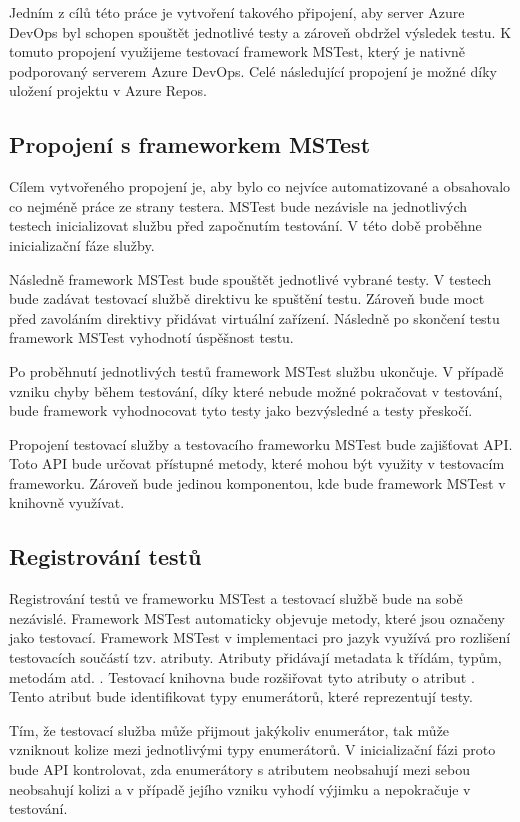 Jedním z cílů této práce je vytvoření takového připojení, aby server Azure DevOps byl schopen spouštět jednotlivé testy a zároveň obdržel výsledek testu. K tomuto propojení využijeme testovací framework MSTest, který je nativně podporovaný serverem Azure DevOps. Celé následující propojení je možné díky uložení projektu v Azure Repos.

\subsection{Propojení s frameworkem MSTest}
Cílem vytvořeného propojení je, aby bylo co nejvíce automatizované a obsahovalo co nejméně práce ze strany testera. MSTest bude nezávisle na jednotlivých testech inicializovat službu před započnutím testování. V této době proběhne inicializační fáze služby. 

Následně framework MSTest bude spouštět jednotlivé vybrané testy. V testech bude zadávat testovací službě direktivu ke spuštění testu. Zároveň bude moct před zavoláním direktivy přidávat virtuální zařízení. Následně po skončení testu framework MSTest vyhodnotí úspěšnost testu.

Po proběhnutí jednotlivých testů framework MSTest službu ukončuje. V případě vzniku chyby během testování, díky které nebude možné pokračovat v testování, bude framework vyhodnocovat tyto testy jako bezvýsledné a testy přeskočí.

Propojení testovací služby a testovacího frameworku MSTest bude zajišťovat API. Toto API bude určovat přístupné metody, které mohou být využity v testovacím frameworku. Zároveň bude jedinou komponentou, kde bude framework MSTest v knihovně využívat.

\subsection{Registrování testů}
Registrování testů ve frameworku MSTest a testovací službě bude na sobě nezávislé. Framework MSTest automaticky objevuje metody, které jsou označeny jako testovací. Framework MSTest v implementaci pro jazyk \csharp{} využívá pro rozlišení testovacích součástí tzv. atributy. Atributy přidávají metadata k třídám, typům, metodám atd. \cite{attribute_docs}. Testovací knihovna bude rozšiřovat tyto atributy o atribut . Tento atribut bude identifikovat typy enumerátorů, které reprezentují testy. 

Tím, že testovací služba může přijmout jakýkoliv enumerátor, tak může vzniknout kolize mezi jednotlivými typy enumerátorů. V inicializační fázi proto bude API kontrolovat, zda enumerátory s atributem  neobsahují mezi sebou neobsahují kolizi a v případě jejího vzniku vyhodí výjimku a nepokračuje v testování.

